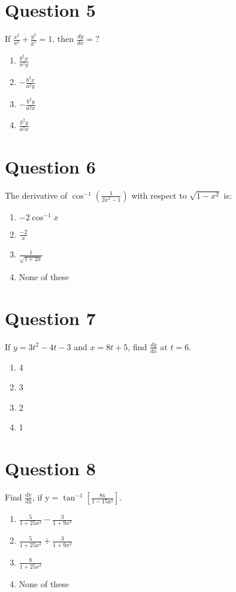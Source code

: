 \documentclass{article}
\begin{document}
\section*{Question 5}
If \(\frac{x^{2}}{a^{2}}+\frac{y^{2}}{b^{2}}=1\), then \(\frac{d y}{d x}=?\)\newline
\begin{enumerate}[label=(\alph*)]
\item \(\frac{b^{2} x}{a^{2} y}\)
\item \(-\frac{b^{2} x}{a^{2} y}\)
\item \(-\frac{b^{2} y}{a^{2} x}\)
\item \(\frac{b^{2} y}{a^{2} x}\)
\end{enumerate}
\newpage
\section*{Question 6}
The derivative of \(\cos ^{-1}\left(\frac{1}{2 x^{2}-1}\right)\) with respect to \(\sqrt{1-x^{2}}\) is:
\begin{enumerate}[label=(\alph*)]
\item \(-2 \cos ^{-1} x\)
\item \(\frac{-2}{x}\)
\item \(\frac{1}{\sqrt{1+2 x}}\)
\item None of these
\end{enumerate}
\newpage
\section*{Question 7}
If \(y=3 t^{2}-4 t-3\) and \(x=8 t+5\), find \(\frac{d y}{d x}\) at \(t=6\).
\begin{enumerate}[label=(\alph*)]
\item 4
\item 3
\item 2
\item 1
\end{enumerate}
\newpage
\section*{Question 8}
Find \(\frac{\mathrm{dy}}{\mathrm{dx}}\), if \(\mathrm{y}=\tan ^{-1}\left[\frac{8 \mathrm{x}}{1-15 \mathrm{x}^{2}}\right]\).
\begin{enumerate}[label=(\alph*)]
\item \(\frac{5}{1+25 x^{2}}-\frac{3}{1+9 x^{2}}\)
\item \(\frac{5}{1+25 x^{2}}+\frac{3}{1+9 x^{2}}\)
\item \(\frac{8}{1+25 x^{2}}\)
\item None of these
\end{enumerate}
\newpage
\end{document}
